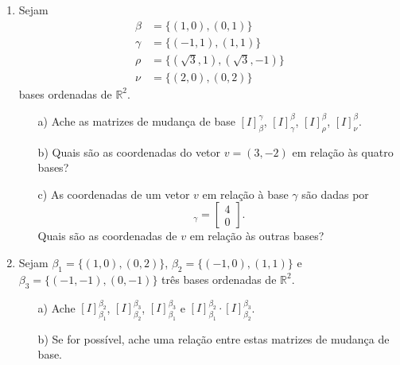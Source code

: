 \documentclass[12pt]{article}
\begin{document}
\begin{enumerate}
     \item Sejam
       \begin{align*}
         \beta &= \{(1,0),(0,1)\}\\
         \gamma &= \{(-1,1),(1,1)\}\\
         \rho &= \{(\sqrt{3},1),(\sqrt{3},-1)\}\\
         \nu &= \{(2,0),(0,2)\}
       \end{align*}
       bases ordenadas de ${\mathbb{R}}^2$.
       \begin{itemize}
       \item[a)] Ache as matrizes de mudança de base $[I]_\beta^\gamma$, $[I]_\gamma^\beta$, $[I]_\rho^\beta$, $[I]_\nu^\beta$.
       \item[b)] Quais são as coordenadas do vetor $v=(3,-2)$ em relação às quatro bases?
       \item[c)] As coordenadas de um vetor $v$ em relação à base $\gamma$ são dadas por
         \begin{equation*}
           [v]_\gamma = \begin{bmatrix} 4\\0\end{bmatrix}.
         \end{equation*}
         Quais são as coordenadas de $v$ em relação às outras bases?
       \end{itemize}

       \item Sejam $\beta_1 = \{(1,0),(0,2)\}$, $\beta_2 = \{(-1,0),(1,1)\}$ e $\beta_3 = \{(-1,-1),(0,-1)\}$ três bases ordenadas de ${\mathbb{R}}^2$.
         \begin{itemize}
           \item[a)] Ache $[I]_{\beta_1}^{\beta_2}$, $[I]_{\beta_2}^{\beta_3}$, $[I]_{\beta_1}^{\beta_3}$ e $[I]_{\beta_1}^{\beta_2} \cdot [I]_{\beta_2}^{\beta_3}$.
           \item[b)] Se for possível, ache uma relação entre estas matrizes de mudança de base.
           \end{itemize}
         \end{enumerate}
\end{document}
